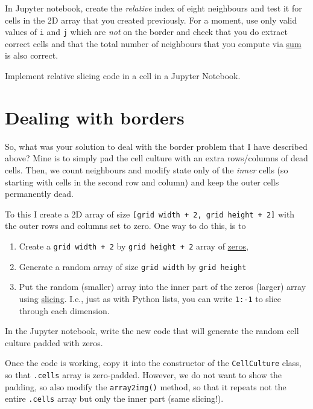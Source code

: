 \documentclass[
]{book}
\providecommand{\tightlist}{%
  \setlength{\itemsep}{0pt}\setlength{\parskip}{0pt}}
\begin{document}
In Jupyter notebook, create the \emph{relative} index of eight neighbours and test it for cells in the 2D array that you created previously. For a moment, use only valid values of \texttt{i} and \texttt{j} which are \emph{not} on the border and check that you do extract correct cells and that the total number of neighbours that you compute via \href{https://numpy.org/doc/stable/reference/generated/numpy.sum.html}{sum} is also correct.

Implement relative slicing code in a cell in a Jupyter Notebook.

\hypertarget{dealing-with-borders}{%
\section{Dealing with borders}\label{dealing-with-borders}}

So, what was your solution to deal with the border problem that I have described above? Mine is to simply pad the cell culture with an extra rows/columns of dead cells. Then, we count neighbours and modify state only of the \emph{inner} cells (so starting with cells in the second row and column) and keep the outer cells permanently dead.

To this I create a 2D array of size \texttt{{[}grid\ width\ +\ 2,\ grid\ height\ +\ 2{]}} with the outer rows and columns set to zero. One way to do this, is to

\begin{enumerate}
\def\labelenumi{\arabic{enumi}.}
\tightlist
\item
  Create a \texttt{grid\ width\ +\ 2} by \texttt{grid\ height\ +\ 2} array of \href{https://numpy.org/doc/stable/reference/generated/numpy.zeros.html}{zeros},
\item
  Generate a random array of size \texttt{grid\ width} by \texttt{grid\ height}
\item
  Put the random (smaller) array into the inner part of the zeros (larger) array using \href{(https://numpy.org/doc/stable/user/absolute_beginners.html\#indexing-and-slicing)}{slicing}. I.e., just as with Python lists, you can write \texttt{1:-1} to slice through each dimension.
\end{enumerate}

In the Jupyter notebook, write the new code that will generate the random cell culture padded with zeros.

Once the code is working, copy it into the constructor of the \texttt{CellCulture} class, so that \texttt{.cells} array is zero-padded. However, we do not want to show the padding, so also modify the \texttt{array2img()} method, so that it repeats not the entire \texttt{.cells} array but only the inner part (same slicing!).
\end{document}
